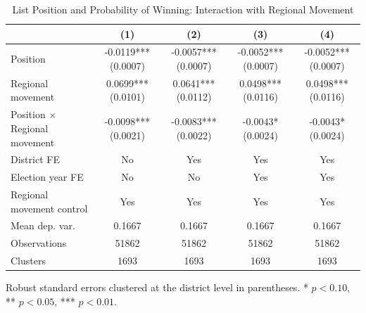 \begin{table}[htbp]
\centering
\caption{List Position and Probability of Winning: Interaction with Regional Movement}
\label{tab:interaction_specs}
\begin{tabular}{lcccc}
\toprule
 & (1) & (2) & (3) & (4) \\
\midrule
Position & -0.0119*** (0.0007) & -0.0057*** (0.0007) & -0.0052*** (0.0007) & -0.0052*** (0.0007) \\
Regional movement & 0.0699*** (0.0101) & 0.0641*** (0.0112) & 0.0498*** (0.0116) & 0.0498*** (0.0116) \\
Position $\times$ Regional movement & -0.0098*** (0.0021) & -0.0083*** (0.0022) & -0.0043* (0.0024) & -0.0043* (0.0024) \\
\midrule
District FE & No & Yes & Yes & Yes \\
Election year FE & No & No & Yes & Yes \\
Regional movement control & Yes & Yes & Yes & Yes \\
Mean dep. var. & 0.1667 & 0.1667 & 0.1667 & 0.1667 \\
Observations & 51862 & 51862 & 51862 & 51862 \\
Clusters & 1693 & 1693 & 1693 & 1693 \\
\bottomrule
\end{tabular}
\begin{flushleft}
\footnotesize Robust standard errors clustered at the district level in parentheses. * $p<0.10$, ** $p<0.05$, *** $p<0.01$.
\end{flushleft}
\end{table}